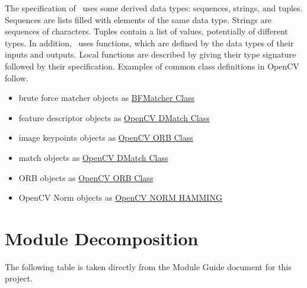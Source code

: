 \documentclass[12pt, titlepage]{article}
\begin{document}
\noindent
The specification of \progname \ uses some derived data types: sequences, strings, and
tuples. Sequences are lists filled with elements of the same data type. Strings
are sequences of characters. Tuples contain a list of values, potentially of
different types. In addition, \progname \ uses functions, which
are defined by the data types of their inputs and outputs. Local functions are
described by giving their type signature followed by their specification. Examples of common 
class definitions in OpenCV follow.
\begin{itemize}
  \item brute force matcher objects as \href{https://docs.opencv.org/3.4/d3/da1/classcv_1_1BFMatcher.html}{BFMatcher Class}
  \item feature descriptor objects as \href{https://docs.opencv.org/3.4/d4/de0/classcv_1_1DMatch.html}{OpenCV DMatch Class}
  \item image keypoints objects as \href{https://docs.opencv.org/3.4/db/d95/classcv_1_1ORB.html}{OpenCV ORB Class}
  \item match objects as \href{https://docs.opencv.org/3.4/d4/de0/classcv_1_1DMatch.html}{OpenCV DMatch Class}
  \item ORB objects as \href{https://docs.opencv.org/3.4/db/d95/classcv_1_1ORB.html}{OpenCV ORB Class}
  \item OpenCV Norm objects as \href{https://docs.opencv.org/4.x/d2/de8/group__core__array.html#ggad12cefbcb5291cf958a85b4b67b6149fa4b063afd04aebb8dd07085a1207da727}{OpenCV NORM HAMMING}
\end{itemize}

\section{Module Decomposition}

The following table is taken directly from the Module Guide document for this project.
\end{document}
